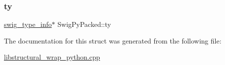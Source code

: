 \mbox{\label{struct_swig_py_packed_aa6f6be0a8a1bff7710200fbe8d51acf0}} 
\subsubsection{\texorpdfstring{ty}{ty}}
{\footnotesize\ttfamily \hyperlink{structswig__type__info}{swig\+\_\+type\+\_\+info}$\ast$ Swig\+Py\+Packed\+::ty}



The documentation for this struct was generated from the following file\+:\begin{DoxyCompactItemize}
\item 
\hyperlink{libstructural__wrap__python_8cpp}{libstructural\+\_\+wrap\+\_\+python.\+cpp}\end{DoxyCompactItemize}
